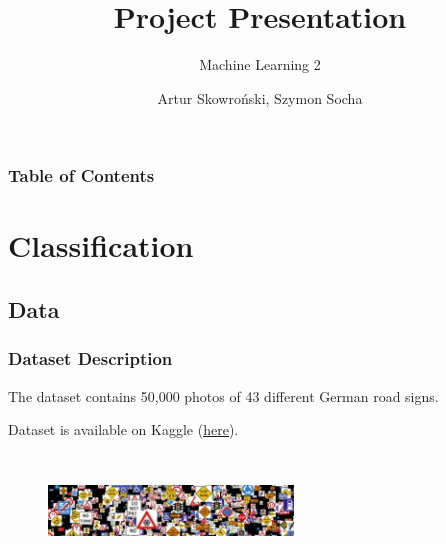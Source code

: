 \documentclass[8pt]{beamer}
\title[Machine-Learining-2\_Project-Presentation\_AS-SS] %
{Project Presentation}
\subtitle{Machine Learning 2}
\author[Artur Skowroński, Szymon Socha] %
{Artur Skowroński, Szymon Socha}
\date[date] %
\begin{document}
\frame{\titlepage}


\begin{frame}
\frametitle{Table of Contents}
\tableofcontents
\end{frame}


\section{Classification}

\subsection{Data}
\begin{frame}
\frametitle{Dataset Description}
The dataset contains 50,000 photos of 43 different German road signs.

Dataset is available on Kaggle (\href{https://www.kaggle.com/datasets/meowmeowmeowmeowmeow/gtsrb-german-traffic-sign}{\underline{here}}).
\begin{figure}[t]
\includegraphics[width=6.5cm, height=3cm]{road-signs.jpg}
\centering
\end{figure}

\end{frame}
\end{document}
